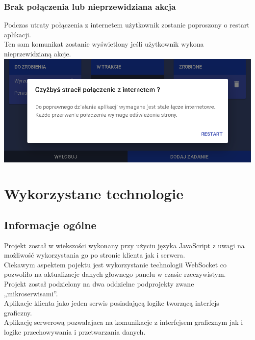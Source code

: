 \documentclass[12pt,a4paper]{article}  %
\begin{document}
		\subsubsection{Brak połączenia lub nieprzewidziana akcja}
		Podczas utraty połączenia z internetem użytkownik zostanie poproszony o restart aplikacji. \\
		Ten sam komunikat zostanie wyświetlony jeśli użytkownik wykona nieprzewidzianą akcje. \\
		\includegraphics[keepaspectratio,scale=0.5]{./img/error.PNG} \\
	\newpage
	\section{Wykorzystane technologie}
		\subsection{Informacje ogólne}
		Projekt został w wiekszości wykonany przy użyciu języka JavaScript z uwagi na możliwość wykorzystania go po stronie klienta jak i serwera. \\
		Ciekawym aspektem pojektu jest wykorzystanie technologii WebSocket co pozwoliło na aktualizacje danych głownego panelu w czasie rzeczywistym. \\
		Projekt został podzielony na dwa oddzielne podprojekty zwane\\ „mikroserwisami”.\\
		Aplikacje klienta jako jeden serwis posiadającą logike tworzącą interfejs\\ graficzny.\\
		Aplikację serwerową pozwalajaca na komunikacje z interfejsem graficznym jak i logike przechowywania i przetwarzania danych.
\end{document}
